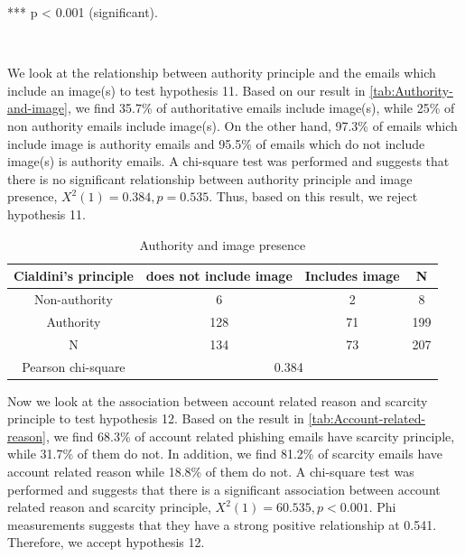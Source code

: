 {*}{*}{*} p < 0.001 (significant).

\ 

We look at the relationship between authority principle and the emails
which include an image(s) to test hypothesis 11. Based on our result
in \autoref{tab:Authority-and-image}, we find 35.7\% of authoritative
emails include image(s), while 25\% of non authority emails include
image(s). On the other hand, 97.3\% of emails which include image
is authority emails and 95.5\% of emails which do not include image(s)
is authority emails. A chi-square test was performed and suggests
that there is no significant relationship between authority principle
and image presence, $X^{2}(1)=0.384,p=0.535$. Thus, based on this
result, we reject hypothesis 11.

\begin{minipage}[t]{1\columnwidth}%
\begin{longtable}{cccc}
\caption{\label{tab:Authority-and-image}Authority and image presence}
\tabularnewline
\toprule 
{\footnotesize{}Cialdini's principle} & {\footnotesize{}does not include image} & {\footnotesize{}Includes image} & \multirow{1}{*}{{\footnotesize{}N}}\tabularnewline
\midrule 
\multirow{1}{*}{{\footnotesize{}Non-authority}} & {\footnotesize{}6} & {\footnotesize{}2} & \multirow{1}{*}{{\footnotesize{}8}}\tabularnewline
\midrule 
\multirow{1}{*}{{\footnotesize{}Authority}} & {\footnotesize{}128} & {\footnotesize{}71} & \multirow{1}{*}{{\footnotesize{}199}}\tabularnewline
\midrule
\midrule 
{\footnotesize{}N} & {\footnotesize{}134} & {\footnotesize{}73} & {\footnotesize{}207}\tabularnewline
\midrule
\midrule 
{\footnotesize{}Pearson chi-square} & \multicolumn{3}{c}{{\footnotesize{}0.384}}\tabularnewline
\midrule
\end{longtable}%
\end{minipage}

Now we look at the association between account related reason and
scarcity principle to test hypothesis 12. Based on the result in \autoref{tab:Account-related-reason},
we find 68.3\% of account related phishing emails have scarcity principle,
while 31.7\% of them do not. In addition, we find 81.2\% of scarcity
emails have account related reason while 18.8\% of them do not. A
chi-square test was performed and suggests that there is a significant
association between account related reason and scarcity principle,
$X^{2}(1)=60.535,p<0.001$. Phi measurements suggests that they have
a strong positive relationship at 0.541. Therefore, we accept hypothesis
12.

